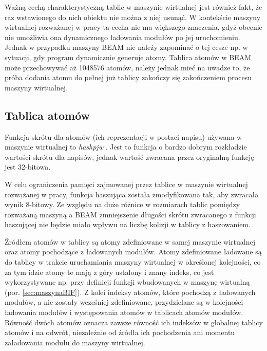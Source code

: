 Ważną cechą charakterystyczną tablic w maszynie wirtualnej jest również fakt, że raz wstawionego do nich obiektu nie można z niej usunąć. W kontekście maszyny wirtualnej rozważanej w pracy ta cecha nie ma większego znaczenia, gdyż obecnie nie umożliwia ona dynamicznego ładowania modułów po jej uruchomieniu. Jednak w przypadku maszyny BEAM nie należy zapominać o tej cesze np. w sytuacji, gdy program dynamicznie generuje atomy. Tablica atomów w BEAM może przechowywać aż 1048576 atomów, należy jednak mieć na uwadze to, że próba dodania atomu do pełnej już tablicy zakończy się zakończeniem procesu maszyny wirtualnej.

\subsection{Tablica atomów}
\label{sub:maszynaTablicaAtomow}

Funkcja skrótu dla atomów (ich reprezentacji w postaci napisu) używana w maszynie wirtualnej to \emph{hashpjw} \cite{Aho1986}. Jest to funkcja o bardzo dobrym rozkładzie wartości skrótu dla napisów, jednak wartość zwracana przez oryginalną funkcję jest 32-bitowa.

W celu ograniczenia pamięci zajmowanej przez tablice w maszynie wirtualnej rozważanej w pracy, funkcja haszująca została zmodyfikowana tak, aby zwracała wynik 8-bitowy. Ze względu na duże różnice w rozmiarach tablic pomiędzy rozważaną maszyną a BEAM zmniejszenie długości skrótu zwracanego z funkcji haszującej nie będzie miało wpływu na liczbę kolizji w tablicy z haszowaniem. 

Źródłem atomów w tablicy są atomy zdefiniowane w samej maszynie wirtualnej oraz atomy pochodzące z ładowanych modułów. Atomy zdefiniowane ładowane są do tablicy w trakcie uruchamiania maszyny wirtualnej w określonej kolejności, co za tym idzie atomy te mają z góry ustalony i znany indeks, co jest wykorzystywane np. przy definicji funkcji wbudowanych w maszynę wirtualną (por. \ref{sec:maszynaBIF}). Z kolei indeksy atomów, które pochodzą z ładowanych modułów, a nie zostały wcześniej zdefiniowane, przydzielane są w kolejności ładowania modułów i występowania atomów w tablicach atomów modułów. Równość dwóch atomów oznacza zawsze równość ich indeksów w globalnej tablicy atomów i na odwrót, niezależnie od źródła ich pochodzenia ani momentu załadowania modułu do maszyny wirtualnej.


